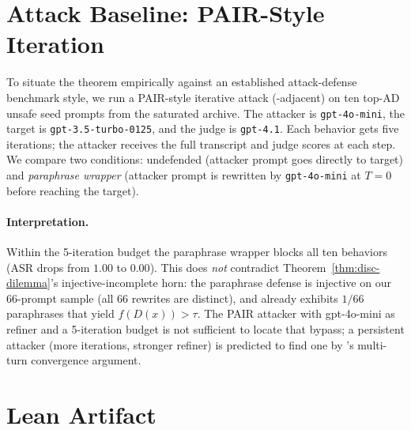 \documentclass[11pt]{article}
\begin{document}
\section{Attack Baseline: PAIR-Style Iteration}
\label{app:pair-baseline}

To situate the theorem empirically against an established attack-defense
benchmark style, we run a PAIR-style iterative attack
(\cite{chao2024jailbreaking}-adjacent) on ten top-AD unsafe seed prompts
from the saturated archive. The attacker is \texttt{gpt-4o-mini}, the
target is \texttt{gpt-3.5-turbo-0125}, and the judge is \texttt{gpt-4.1}.
Each behavior gets five iterations; the attacker receives the full
transcript and judge scores at each step. We compare two conditions:
undefended (attacker prompt goes directly to target) and
\emph{paraphrase wrapper} (attacker prompt is rewritten by
\texttt{gpt-4o-mini} at $T=0$ before reaching the target).

\begin{table}[h]
\centering
\small
\caption{PAIR-style attack-success rate with and without a continuous
paraphrase wrapper (10 behaviors, 5 iterations, gpt-3.5-turbo target,
gpt-4.1 judge).}
\label{tab:pair-baseline}

\end{table}

\paragraph{Interpretation.}
Within the 5-iteration budget the paraphrase wrapper blocks all ten
behaviors (ASR drops from $1.00$ to $0.00$). This does \emph{not}
contradict Theorem~\ref{thm:disc-dilemma}'s injective-incomplete
horn: the paraphrase defense is injective on our 66-prompt sample
(all 66 rewrites are distinct), and 
already exhibits $1/66$ paraphrases that yield $f(D(x)) > \tau$. The
PAIR attacker with gpt-4o-mini as refiner and a 5-iteration budget
is not sufficient to locate that bypass; a persistent attacker (more
iterations, stronger refiner) is predicted to find one by
's multi-turn convergence argument.


\section{Lean Artifact}
\label{app:artifact}
\end{document}
